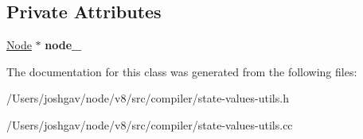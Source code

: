 \subsection*{Private Attributes}
\begin{DoxyCompactItemize}
\item 
\hyperlink{classv8_1_1internal_1_1compiler_1_1_node}{Node} $\ast$ {\bfseries node\+\_\+}\hypertarget{classv8_1_1internal_1_1compiler_1_1_state_values_access_aa3559fc3ada53fbb1059d011556ba710}{}\label{classv8_1_1internal_1_1compiler_1_1_state_values_access_aa3559fc3ada53fbb1059d011556ba710}

\end{DoxyCompactItemize}


The documentation for this class was generated from the following files\+:\begin{DoxyCompactItemize}
\item 
/\+Users/joshgav/node/v8/src/compiler/state-\/values-\/utils.\+h\item 
/\+Users/joshgav/node/v8/src/compiler/state-\/values-\/utils.\+cc\end{DoxyCompactItemize}
